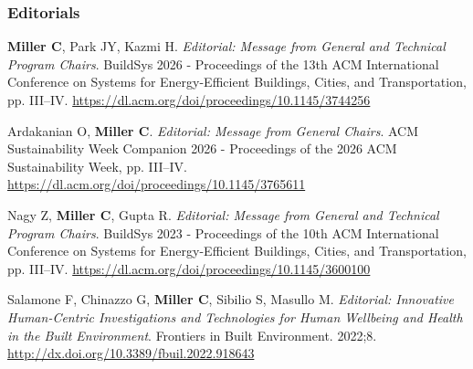 \documentclass[10pt,a4paper]{article}
\begin{document}
\begin{small}
\subsubsection*{Editorials}
\begin{etaremune}
\item
\textbf{Miller C}, Park JY, Kazmi H. \emph{Editorial: Message from General and Technical Program Chairs}. BuildSys 2026 - Proceedings of the 13th ACM International Conference on Systems for Energy-Efficient Buildings, Cities, and Transportation, pp. III–IV. \url{https://dl.acm.org/doi/proceedings/10.1145/3744256}
\item
Ardakanian O, \textbf{Miller C}. \emph{Editorial: Message from General Chairs}. ACM Sustainability Week Companion 2026 - Proceedings of the 2026 ACM Sustainability Week, pp. III–IV. \url{https://dl.acm.org/doi/proceedings/10.1145/3765611}
\item
Nagy Z, \textbf{Miller C}, Gupta R. \emph{Editorial: Message from General and Technical Program Chairs}. BuildSys 2023 - Proceedings of the 10th ACM International Conference on Systems for Energy-Efficient Buildings, Cities, and Transportation, pp. III–IV. \url{https://dl.acm.org/doi/proceedings/10.1145/3600100}
\item
Salamone F, Chinazzo G, \textbf{Miller C}, Sibilio S, Masullo M. \emph{Editorial: Innovative Human-Centric Investigations and Technologies for Human Wellbeing and Health in the Built Environment}. Frontiers in Built Environment. 2022;8. \url{http://dx.doi.org/10.3389/fbuil.2022.918643}
\end{etaremune}




\end{small}
\end{document}
